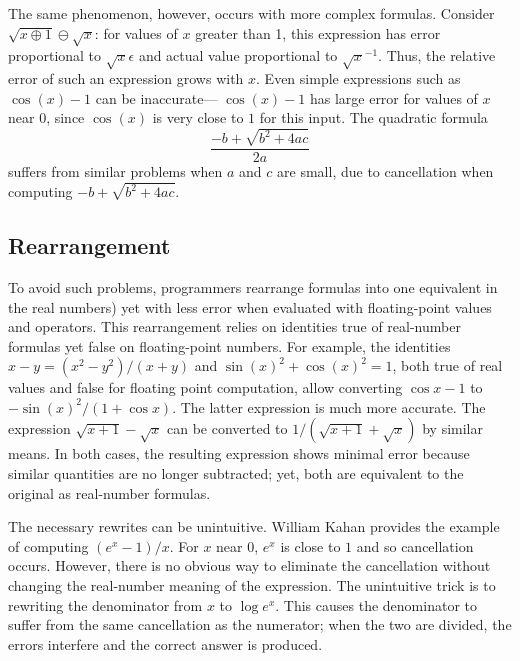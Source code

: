 \documentclass[paper.tex]{subfiles}
\begin{document}
The same phenomenon, however, occurs with more complex formulas.
Consider $\sqrt{x \oplus 1} \ominus \sqrt{x}$:
  for values of $x$ greater than 1, this expression
  has error proportional to $\sqrt{x} \epsilon$
  and actual value proportional to $\sqrt{x}^{-1}$.
Thus, the relative error of such an expression grows with $x$.
Even simple expressions such as $\cos(x) - 1$ can be inaccurate---%
  $\cos(x) - 1$ has large error for values of $x$ near 0,
  since $\cos(x)$ is very close to $1$ for this input.
The quadratic formula \[\frac{-b + \sqrt{b^2 + 4 a c}}{2 a}\]
  suffers from similar problems when $a$ and $c$ are small,
  due to cancellation when computing $-b + \sqrt{b^2 + 4 a c}$.

\subsection{Rearrangement}

To avoid such problems, programmers rearrange formulas
  into one equivalent in the real numbers)
  yet with less error when evaluated
  with floating-point values and operators.
This rearrangement relies on identities
  true of real-number formulas yet false on floating-point numbers.
For example, the identities $x - y = (x^2 - y^2) / (x + y)$
  and $\sin(x)^2 + \cos(x)^2 = 1$,
  both true of real values and false for floating point computation,
  allow converting $\cos x - 1$ to $- \sin(x)^2 / (1 + \cos x)$.
The latter expression is much more accurate.
The expression $\sqrt{x+1} - \sqrt{x}$ can be converted
  to $1 / (\sqrt{x+1} + \sqrt{x})$ by similar means.
In both cases, the resulting expression shows minimal error
  because similar quantities are no longer subtracted;
  yet, both are equivalent to the original as real-number formulas.

The necessary rewrites can be unintuitive.
William Kahan provides the example~\cite{}
  of computing $(e^x - 1) / x$.
For $x$ near $0$, $e^x$ is close to $1$ and so cancellation occurs.
However, there is no obvious way to eliminate the cancellation
  without changing the real-number meaning of the expression.
The unintuitive trick is to rewriting the denominator
  from $x$ to $\log e^x$.
This causes the denominator to suffer
  from the same cancellation as the numerator;
  when the two are divided,
  the errors interfere and the correct answer is produced.
\end{document}
